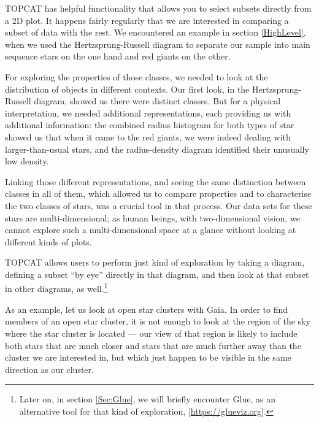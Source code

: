 \documentclass[twocolumn,apj]{openjournal}
\begin{document}
TOPCAT has helpful functionality that allows you to select subsets directly from a 2D plot. It happens fairly regularly that we are interested in comparing a subset of data with the rest. We encountered an example in section \ref{HighLevel}, when we used the Hertzsprung-Russell diagram to separate our sample into main sequence stars on the one hand and red giants on the other. 

For exploring the properties of those classes, we needed to look at the distribution of objects in different contexts. Our first look, in the Hertzsprung-Russell diagram, showed us there were distinct classes. But for a physical interpretation, we needed additional representations, each providing us with additional information: the combined radius histogram for both types of star showed us that when it came to the red giants, we were indeed dealing with larger-than-usual stars, and the radius-density diagram identified their unusually low density. 

Linking those different representations, and seeing the same distinction between classes in all of them, which allowed us to compare properties and to characterise the two classes of stars, was a crucial tool in that process. Our data sets for these stars are multi-dimensional; as human beings, with two-dimensional vision, we cannot explore such a multi-dimensional space at a glance without looking at different kinds of plots.

TOPCAT allows users to perform just kind of exploration by taking a diagram, defining a subset ``by eye'' directly in that diagram, and then look at that subset in other diagrams, as well.\footnote{Later on, in section \ref{Sec:Glue}, we will briefly encounter Glue, as an alternative tool for that kind of exploration, [\href{https://glueviz.org}{https://glueviz.org}].} 

As an example, let us look at open star clusters with Gaia. In order to find members of an open star cluster, it is not enough to look at the region of the sky where the star cluster is located --- our view of that region is likely to include both stars that are much closer and stars that are much further away than the cluster we are interested in, but which just happen to be visible in the same direction as our cluster. 
\end{document}
